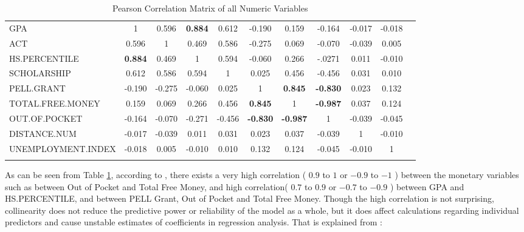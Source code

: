 \documentclass[12pt,english]{report}
\begin{document}
\begin{table}
{\begin{tabular}{@{\extracolsep{4pt}} lcccccccccc}
GPA         & 1       & 0.596  & \textbf{0.884}
& 0.612                 & -0.190
& 0.159             & -0.164
& -0.017            & -0.018 \\
ACT                & 0.596          & 1      & 0.469
& 0.586            & -0.275
& 0.069                    & -0.070
& -0.039             & 0.005\\
HS.PERCENTILE      & \textbf{0.884} & 0.469  & 1
& 0.594                                                   & -0.060
& 0.266                                                       & -.0271
& 0.011                                                   & -0.010\\
SCHOLARSHIP        & 0.612          & 0.586  & 0.594
& 1                                                       & 0.025
& 0.456                             & -0.456
& 0.031                                                   & 0.010\\
PELL.GRANT         & -0.190         & -0.275 & -0.060
& 0.025                                                   & 1
& \textbf{0.845}         & \textbf{-0.830}
& 0.023       & 0.132\\
TOTAL.FREE.MONEY   & 0.159          & 0.069  & 0.266
& 0.456           & \textbf{0.845}
& 1          & \textbf{-0.987}
& 0.037                                                   & 0.124\\
OUT.OF.POCKET      & -0.164         & -0.070 & -0.271
& -0.456         & \textbf{-0.830}
& \textbf{-0.987}                                             & 1
& -0.039                                                  & -0.045\\
DISTANCE.NUM       & -0.017         & -0.039 & 0.011
& 0.031        & 0.023
& 0.037            & -0.039
& 1                                                       & -0.010\\
UNEMPLOYMENT.INDEX & -0.018         & 0.005  & -0.010
& 0.010                                                   & 0.132
& 0.124          & -0.045
& -0.010         & 1 \\
\hline \\[-1.8ex]                                                            
\end{tabular}}
\caption{Pearson Correlation Matrix of all Numeric Variables} 
  \label{correlation_matrix} 
\end{table}


As can be seen from Table \ref{correlation_matrix},  according to
\citep{hinkle2003applied},
there exists a very high correlation ( $0.9$ to $1$ or $-0.9$ to $-1$ ) between
the monetary
variables such as between Out of Pocket and Total Free Money, and high
correlation( $0.7$ to
$0.9$ or $-0.7$ to $-0.9$ ) between GPA and HS.PERCENTILE, and between PELL
Grant, Out of Pocket
and Total Free Money. Though the high correlation is not surprising,
collinearity does not reduce
the predictive power or reliability of the model as a whole, but it does affect
calculations
regarding individual predictors and cause unstable estimates of coefficients in
regression analysis.
That is explained from \citep{wiki:Multicollinearity}:
\end{document}
